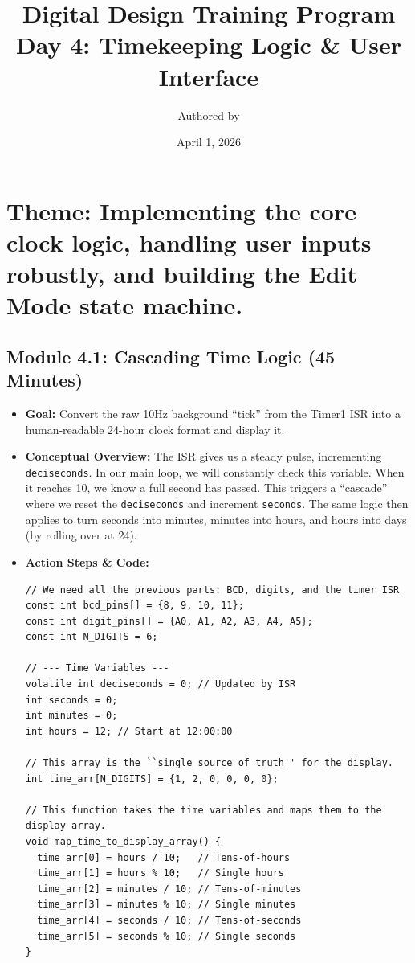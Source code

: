 \documentclass[11pt,a4paper]{article}
\title{Digital Design Training Program \\ \large Day 4: Timekeeping Logic \& User Interface}
\author{Authored by }
\date{April 1, 2026}
\begin{document}
\maketitle

\section*{Theme: Implementing the core clock logic, handling user inputs robustly, and building the Edit Mode state machine.}

\subsection*{Module 4.1: Cascading Time Logic (45 Minutes)}

\begin{itemize}
    \item \textbf{Goal:} Convert the raw 10Hz background ``tick'' from the Timer1 ISR into a human-readable 24-hour clock format and display it.
    \item \textbf{Conceptual Overview:} The ISR gives us a steady pulse, incrementing \verb|deciseconds|. In our main loop, we will constantly check this variable. When it reaches 10, we know a full second has passed. This triggers a ``cascade'' where we reset the \verb|deciseconds| and increment \verb|seconds|. The same logic then applies to turn seconds into minutes, minutes into hours, and hours into days (by rolling over at 24).
    \item \textbf{Action Steps \& Code:}
\begin{lstlisting}[caption={Code for Module 4.1: Full Clock Logic}]
// We need all the previous parts: BCD, digits, and the timer ISR
const int bcd_pins[] = {8, 9, 10, 11};
const int digit_pins[] = {A0, A1, A2, A3, A4, A5};
const int N_DIGITS = 6;

// --- Time Variables ---
volatile int deciseconds = 0; // Updated by ISR
int seconds = 0;
int minutes = 0;
int hours = 12; // Start at 12:00:00

// This array is the ``single source of truth'' for the display.
int time_arr[N_DIGITS] = {1, 2, 0, 0, 0, 0};

// This function takes the time variables and maps them to the display array.
void map_time_to_display_array() {
  time_arr[0] = hours / 10;   // Tens-of-hours
  time_arr[1] = hours % 10;   // Single hours
  time_arr[2] = minutes / 10; // Tens-of-minutes
  time_arr[3] = minutes % 10; // Single minutes
  time_arr[4] = seconds / 10; // Tens-of-seconds
  time_arr[5] = seconds % 10; // Single seconds
}


\end{lstlisting}
\end{itemize}
\end{document}
